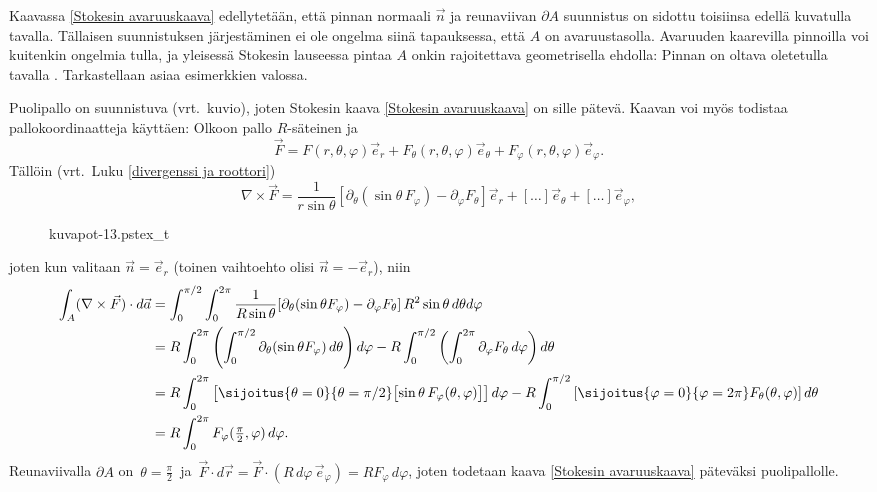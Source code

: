 Kaavassa \eqref{Stokesin avaruuskaava} edellytetään, että pinnan normaali $\vec n$ ja
reunaviivan $\partial A$ suunnistus on sidottu toisiinsa edellä kuvatulla tavalla.
Tällaisen suunnistuksen järjestäminen ei ole ongelma siinä tapauksessa, että $A$ on
avaruustasolla. Avaruuden kaarevilla pinnoilla voi kuitenkin ongelmia tulla, ja yleisessä
Stokesin lauseessa pintaa $A$ onkin rajoitettava geometrisella ehdolla: Pinnan on oltava
%
oletetulla tavalla . Tarkastellaan asiaa esimerkkien valossa.

\begin{multicols}{2} \raggedcolumns
\begin{Exa} Puolipallo on suunnistuva (vrt.\ kuvio), joten Stokesin kaava
\eqref{Stokesin avaruuskaava} on sille pätevä. Kaavan voi myös todistaa pallokoordinaatteja
käyttäen: Olkoon pallo $R$-säteinen ja
\[
\vec F=F(r,\theta,\varphi)\vec e_r+F_\theta(r,\theta,\varphi)\vec e_\theta
                                  +F_\varphi(r,\theta,\varphi)\vec e_\varphi.
\]
Tällöin (vrt.\ Luku \ref{divergenssi ja roottori})
\[
\nabla\times\vec F=\frac{1}{r\sin\theta}[\partial_\theta(\sin\theta\,F_\varphi)
                  -\partial_\varphi F_\theta]\vec e_r
                  +[\ldots]\vec e_\theta+ [\ldots]\vec e_\varphi,
\]
\begin{figure}[H]
\begin{center}
{kuvapot-13.pstex_t}
\end{center}
\end{figure}
\end{Exa}
\end{multicols}
joten kun valitaan $\vec n=\vec e_r$ (toinen vaihtoehto olisi $\vec n=-\vec e_r$), niin
\begin{align*}
\int_A (\nabla\times\vec F)\cdot d\vec a
&=\int_0^{\pi/2}\int_0^{2\pi} \frac{1}{R\sin\theta}[\partial_\theta(\sin\theta F_\varphi)
                            -\partial_\varphi F_\theta]\,R^2\sin\theta\,d\theta d\varphi \\
&= R\int_0^{2\pi}
   \left(\int_0^{\pi/2} \partial_\theta (\sin\theta F_\varphi)\,d\theta\right)d\varphi 
    -R \int_0^{\pi/2}\left(\int_0^{2\pi} \partial_\varphi F_\theta\,d\varphi\right)d\theta \\
&= R\int_0^{2\pi}\left[\sijoitus{\theta=0}
                 {\theta=\pi/2}\bigl[\sin\theta\,F_\varphi(\theta,\varphi)\bigr]\right]d\varphi
   -R\int_0^{\pi/2}\left[\sijoitus{\varphi=0}
                   {\varphi=2\pi} F_\theta(\theta,\varphi)\right]d\theta \\
&= R\int_0^{2\pi} F_\varphi(\tfrac{\pi}{2},\varphi)\,d\varphi.
\end{align*}
Reunaviivalla $\partial A$ on $\,\theta=\frac{\pi}{2}\,$ ja
$\,\vec F\cdot d\vec r=\vec F\cdot (R\,d\varphi\,\vec e_\varphi)=RF_\varphi\,d\varphi$,
joten todetaan kaava \eqref{Stokesin avaruuskaava} päteväksi puolipallolle. \loppu

